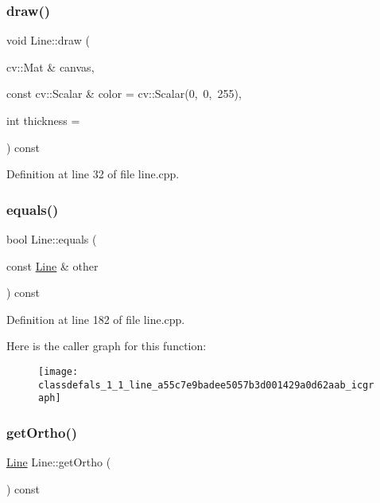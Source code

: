 \subsubsection{\texorpdfstring{draw()}{draw()}}
{\footnotesize\ttfamily void Line\+::draw (\begin{DoxyParamCaption}\item[{cv\+::\+Mat \&}]{canvas,  }\item[{const cv\+::\+Scalar \&}]{color = {\ttfamily cv\+:\+:Scalar(0,~0,~255)},  }\item[{int}]{thickness = {} }\end{DoxyParamCaption}) const}



Definition at line 32 of file line.\+cpp.

\mbox{\label{classdefals_1_1_line_a55c7e9badee5057b3d001429a0d62aab}} 
\subsubsection{\texorpdfstring{equals()}{equals()}}
{\footnotesize\ttfamily bool Line\+::equals (\begin{DoxyParamCaption}\item[{const \hyperlink{classdefals_1_1_line}{Line} \&}]{other }\end{DoxyParamCaption}) const}



Definition at line 182 of file line.\+cpp.

Here is the caller graph for this function\+:\nopagebreak
\begin{figure}[H]
\begin{center}
\leavevmode
\texttt{[image: classdefals\_1\_1\_line\_a55c7e9badee5057b3d001429a0d62aab\_icgraph]}
\end{center}
\end{figure}
\mbox{\label{classdefals_1_1_line_a492062a13ab9927c7b933a1cbdfffc37}} 
\subsubsection{\texorpdfstring{get\+Ortho()}{getOrtho()}}
{\footnotesize\ttfamily \hyperlink{classdefals_1_1_line}{Line} Line\+::get\+Ortho (\begin{DoxyParamCaption}{ }\end{DoxyParamCaption}) const}



